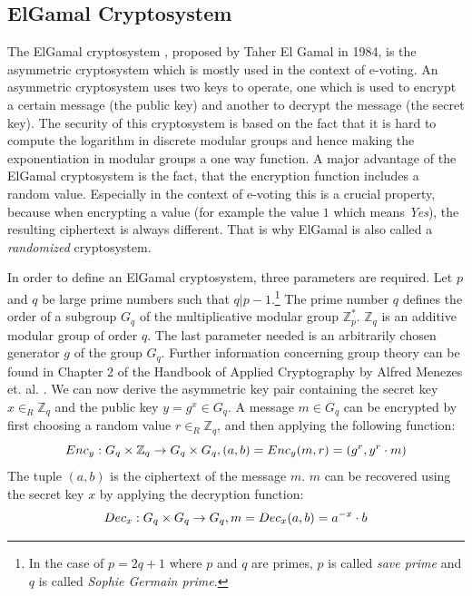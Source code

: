 \documentclass[numbers=noenddot, abstract=on, a4paper, headsepline,
footsepline, oneside, draft=off]{scrreprt}
\begin{document}
\subsection{ElGamal Cryptosystem}
\label{sec:elgamal}
The ElGamal cryptosystem \cite{EG84}, proposed by Taher El Gamal in 1984, is the
asymmetric cryptosystem which is mostly used in the context of e-voting. An
asymmetric cryptosystem uses two keys to operate, one which is used to encrypt a
certain message (the public key) and another to decrypt the message (the secret
key). The security of this cryptosystem is based on the fact that it is hard to
compute the logarithm in discrete modular groups and hence making the
exponentiation in modular groups a one way function. A major advantage of the
ElGamal cryptosystem is the fact, that the encryption function includes a random
value. Especially in the context of e-voting this is a crucial property, because
when encrypting a value (for example the value $1$ which means \textit{Yes}),
the resulting ciphertext is always different. That is why ElGamal is also called
a \textit{randomized} cryptosystem.

In order to define an ElGamal cryptosystem, three parameters are required. Let
$p$ and $q$ be large prime numbers such that $q|p-1$.\footnote{In the case of
$p=2q+1$ where $p$ and $q$ are primes, $p$ is called \emph{save prime} and $q$
is called \emph{Sophie Germain prime}.}
The prime number $q$ defines the order of a subgroup $G_q$ of the multiplicative
modular group $\mathbb{Z}^*_p$. $\mathbb{Z}_q$ is an additive modular group of order $q$. The
last parameter needed is an arbitrarily chosen generator $g$ of the group $G_q$.
Further information concerning group theory can be found in Chapter 2 of the
Handbook of Applied Cryptography by Alfred Menezes et. al. \cite{book:hac}. We
can now derive the asymmetric key pair containing the secret key $x \in_R
\mathbb{Z}_q$ and the public key $y=g^x \in G_q$. A message $m \in G_q$ can be
encrypted by first choosing a random value $r \in_R \mathbb{Z}_q$, and then
applying the following function:
\begin{equation}
Enc_y : G_q \times \mathbb{Z}_q \rightarrow G_q \times G_q,
(a, b)=Enc_y(m, r)=(g^r, y^r \cdot m) \notag
\end{equation}
The tuple $(a, b)$ is the ciphertext of the message $m$. $m$ can be recovered using the secret key $x$
by applying the decryption function:
\begin{equation}
Dec_x : G_q \times G_q \rightarrow G_q,
m=Dec_x(a, b)=a^{-x} \cdot b \notag
\end{equation}
\end{document}
